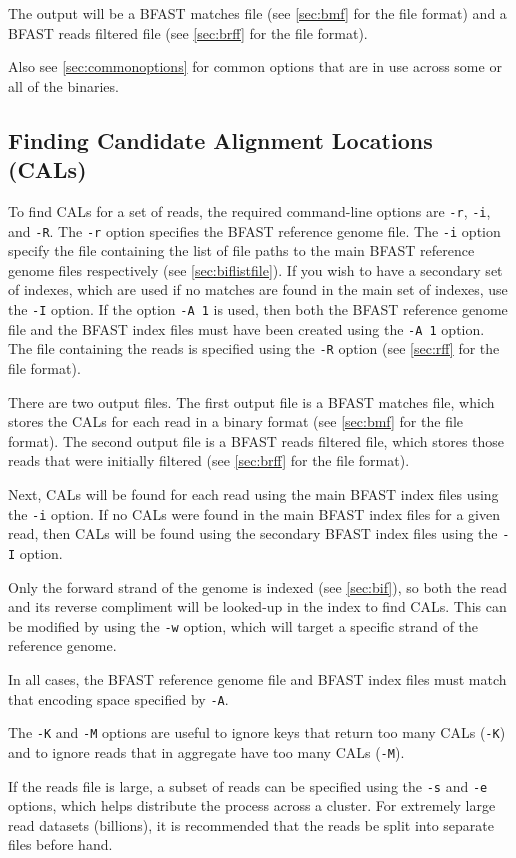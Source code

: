 \documentclass[a4paper,12pt]{book}
\newcommand{\TT}[1]{{\tt #1}} %
\newcommand{\BRGF}{BFAST reference genome file} %
\newcommand{\BIF}{BFAST index file} %
\newcommand{\BMF}{BFAST matches file} %
\newcommand{\BRFF}{BFAST reads filtered file} %
\begin{document}
The output will be a \BMF{} (see \autoref{sec:bmf} for the file format) and a \BRFF{} (see \autoref{sec:brff} for the file format).

Also see \autoref{sec:commonoptions} for common options that are in use across some or all of the binaries.
\subsection{Finding Candidate Alignment Locations (CALs)}
\label{sec:finding-cals}
To find CALs for a set of reads, the required command-line options are \TT{-r}, \TT{-i}, and \TT{-R}.
The \TT{-r} option specifies the \BRGF{}.
The \TT{-i} option specify the file containing the list of file paths to the main \BRGF{s} respectively (see \autoref{sec:biflistfile}).
If you wish to have a secondary set of indexes, which are used if no matches are found in the main set of indexes, use the \TT{-I} option.
If the option \TT{-A 1} is used, then both the \BRGF{} and the \BIF{s} must have been created using the \TT{-A 1} option.
The file containing the reads is specified using the \TT{-R} option (see \autoref{sec:rff} for the file format).

There are two output files.
The first output file is a \BMF{}, which stores the CALs for each read in a binary format (see \autoref{sec:bmf} for the file format).
The second output file is a \BRFF{}, which stores those reads that were initially filtered (see \autoref{sec:brff} for the file format).

Next, CALs will be found for each read using the main \BIF{s} using the \TT{-i} option.
If no CALs were found in the main \BIF{s} for a given read, then CALs will be found using the secondary \BIF{s} using the \TT{-I} option.

Only the forward strand of the genome is indexed (see \autoref{sec:bif}), so both the read and its reverse compliment will be looked-up in the index to find CALs.  
This can be modified by using the \TT{-w} option, which will target a specific strand of the reference genome.

In all cases, the \BRGF{} and \BIF{s} must match that encoding space specified by \TT{-A}.

The \TT{-K} and \TT{-M} options are useful to ignore keys that return too many CALs (\TT{-K}) and to ignore reads that in aggregate have too many CALs (\TT{-M}).

If the reads file is large, a subset of reads can be specified using the \TT{-s} and \TT{-e} options, which helps distribute the process across a cluster.
For extremely large read datasets (billions), it is recommended that the reads be split into separate files before hand.
\end{document}
